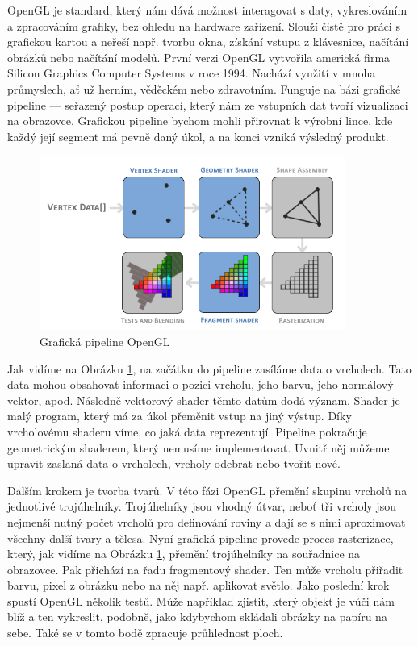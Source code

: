 \documentclass[12pt]{article}
\begin{document}
OpenGL je standard, který nám dává možnost interagovat s daty, vykreslováním a zpracováním grafiky, bez ohledu na hardware zařízení. Slouží čistě pro práci s grafickou kartou a neřeší např. tvorbu okna, získání vstupu z klávesnice, načítání obrázků nebo načítání modelů. První verzi OpenGL vytvořila americká firma Silicon
Graphics Computer Systems v roce 1994. Nachází využití v mnoha průmyslech, ať už herním, věděckém nebo zdravotním. Funguje na bázi grafické pipeline — seřazený postup operací, který nám ze vstupních dat tvoří vizualizaci na obrazovce. Grafickou pipeline bychom mohli přirovnat k výrobní lince, kde každý její segment má pevně daný úkol, a na konci vzniká výsledný produkt.\cite{Shreiner_2013}

\vspace{0.5cm}
\begin{figure}[h]
    \centering
    \includegraphics[width=10cm]{opengl_pipeline.png}
    \caption[Grafická pipeline OpenGL]{Grafická pipeline OpenGL \cite{pipeline_img}}
    \label{fig:Grafická pipeline OpenGL}
\end{figure}
\pagebreak

Jak vidíme na Obrázku \ref{fig:Grafická pipeline OpenGL}, na začátku do pipeline zasíláme data o vrcholech. Tato data mohou obsahovat informaci o pozici vrcholu, jeho barvu, jeho normálový vektor, apod. Následně vektorový shader těmto datům dodá význam. Shader je malý program, který má za úkol přeměnit vstup na jiný výstup.\cite{lopgl_shaders} Díky vrcholovému shaderu víme, co jaká data reprezentují. Pipeline pokračuje geometrickým shaderem, který nemusíme implementovat. Uvnitř něj můžeme upravit zaslaná data o vrcholech, vrcholy odebrat nebo tvořit nové.\cite{lopgl_geometry_shader}

Dalším krokem je tvorba tvarů. V této fázi OpenGL přemění skupinu vrcholů na jednotlivé trojúhelníky. Trojúhelníky jsou vhodný útvar, neboť tři vrcholy jsou nejmenší nutný počet vrcholů pro definování roviny a dají se s nimi aproximovat všechny další tvary a tělesa. Nyní grafická pipeline provede proces rasterizace, který, jak vidíme na Obrázku \ref{fig:Grafická pipeline OpenGL}, přemění trojúhelníky na souřadnice na obrazovce. Pak přichází na řadu fragmentový shader. Ten může vrcholu přiřadit barvu, pixel z obrázku nebo na něj např. aplikovat světlo. Jako poslední krok spustí OpenGL několik testů. Může například zjistit, který objekt je vůči nám blíž a ten vykreslit, podobně, jako kdybychom skládali obrázky na papíru na sebe. Také se v tomto bodě zpracuje průhlednost ploch.
\end{document}
